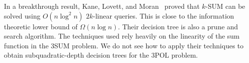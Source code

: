 In a breakthrough result, Kane, Lovett, and Moran~\cite{KLM17} proved
that $k$-SUM can be solved using $O(n \log^2 n)$ $2k$-linear queries. This is
close to the information theoretic lower bound of $\Omega(n \log n)$. Their
decision tree is also a prune and search algorithm. The techniques used rely
heavily on the linearity of the sum function in the 3SUM problem. We do not see
how to apply their techniques to obtain subquadratic-depth decision trees for
the 3POL problem.
